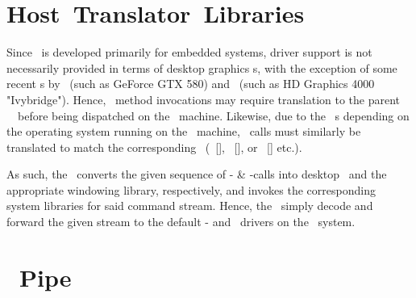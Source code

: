 
\section*{Host~Translator~Libraries}
\label{sec:appendixa_hostsystemtranslatorlibraries}

Since \termopengles\ is developed primarily for embedded systems, driver support is not necessarily provided in terms of desktop graphics \termgpu s, with the exception of some recent \termgpu s by \termnvidia\ (such as GeForce GTX 580) and \termintel\ (such as HD Graphics 4000 "Ivybridge").
Hence, \termapi\ method invocations may require translation to the parent \termapi\ \termopengl\ before being dispatched on the \termhost\ machine.
Likewise, due to the \termegl\ \termabi s depending on the operating system running on the \termhost\ machine, \termegl\ calls must similarly be translated to match the corresponding \termabi\ (\termxgl\ [\termlinux ], \termagl\ [\termosx ], or \termwgl\ [\termwindows ] etc.).

As such, the \termhosttranslatorlibraries\ converts the given sequence of \termopengles - \& \termegl -calls into desktop \termopengl\ and the appropriate windowing library, respectively, and invokes the corresponding system libraries for said command stream.
Hence, the \termhosttranslatorlibraries\ simply decode and forward the given stream to the default \termopengl - and \termegl\ drivers on the \termhost\ system.

\section*{\termsimics ~Pipe}
\label{sec:appendixa_simicspipe}

